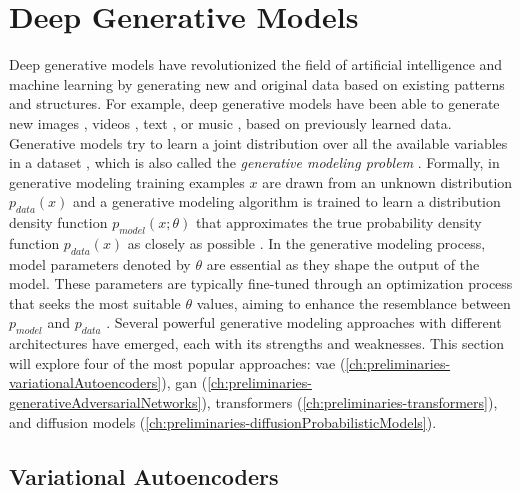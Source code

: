 \section{Deep Generative Models}
\label{ch:preliminaries-generativeMlgorithms}

Deep generative models have revolutionized the field of artificial intelligence and machine learning by generating new and original data based on existing patterns and structures.
For example, deep generative models have been able to generate new images \cite{ho2020DenoisingDiffusionProbabilistic}, videos \cite{ho2022VideoDiffusionModels}, text \cite{openai2022ChatGPTOptimizingLanguage}, or music \cite{agostinelli2023MusicLMGeneratingMusic}, based on previously learned data. 
Generative models try to learn a joint distribution over all the available variables in a dataset \cite{kingma2019IntroductionVariationalAutoencoders}, which is also called the \textit{generative modeling problem} \cite{goodfellow2020GenerativeAdversarialNetworks}.
Formally, in generative modeling training examples $x$ are drawn from an unknown distribution $p_{data}(x)$ and a generative modeling algorithm is trained to learn a distribution density function $p_{model}(x;\theta)$ that approximates the true probability density function $p_{data}(x)$ as closely as possible \cite[p. 139]{goodfellow2020GenerativeAdversarialNetworks}.
In the generative modeling process, model parameters denoted by $\theta$ are essential as they shape the output of the model. 
These parameters are typically fine-tuned through an optimization process that seeks the most suitable $\theta$ values, aiming to enhance the resemblance between $p_{model}$ and $p_{data}$ \cite[p. 139]{goodfellow2020GenerativeAdversarialNetworks}.
Several powerful generative modeling approaches with different architectures have emerged, each with its strengths and weaknesses. 
This section will explore four of the most popular approaches: \acrfull{vae} (\autoref{ch:preliminaries-variationalAutoencoders}), \acrfull{gan} (\autoref{ch:preliminaries-generativeAdversarialNetworks}), transformers (\autoref{ch:preliminaries-transformers}), and diffusion models (\autoref{ch:preliminaries-diffusionProbabilisticModels}). 

\subsection{Variational Autoencoders}
\label{ch:preliminaries-variationalAutoencoders} 


